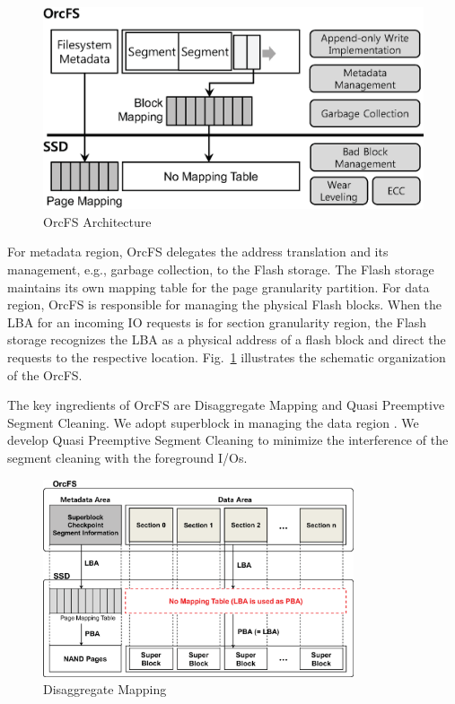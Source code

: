 \documentclass[prodmode,acmtecs]{acmsmall}
\begin{document}
\begin{figure}[t]
\begin{center}
\includegraphics[width=3 in]{./figure/usl_architecture}
\caption{OrcFS Architecture}
\label{fig:usl_layout}
\end{center}
\end{figure}

For metadata region, OrcFS delegates the address translation and its
management, e.g., garbage collection, to the Flash storage. The Flash
storage maintains its own mapping table for the page granularity
partition. For data region, OrcFS is responsible for managing the
physical Flash blocks. When the LBA for an incoming IO requests is for
section granularity region, the Flash storage recognizes the LBA as a
physical address of a flash block and direct the requests to the
respective location.  Fig.~\ref{fig:usl_layout} illustrates the
schematic organization of the OrcFS.

The key ingredients of OrcFS are Disaggregate Mapping and Quasi
Preemptive Segment Cleaning.  We adopt superblock in managing the
data region \cite{park2009sub}.  We develop Quasi Preemptive Segment
Cleaning to minimize the interference of the segment cleaning with
the foreground I/Os.

\begin{figure}[t]
\begin{center}
\includegraphics[width=3.6in]{./figure/usl_layout}
\caption{Disaggregate Mapping}
\label{fig:da_mapping_layout}
\end{center}
\end{figure}
\end{document}
